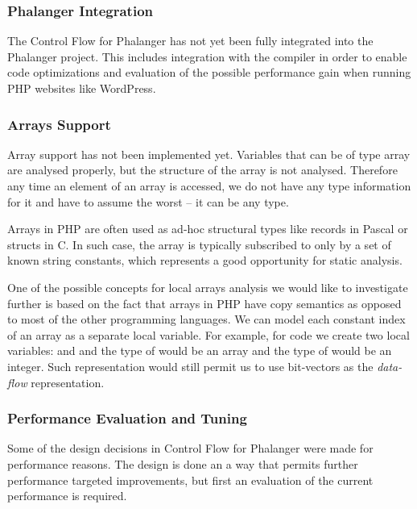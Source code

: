         \subsubsection*{Phalanger Integration}
        The Control Flow for Phalanger has not yet been fully 
        integrated into the Phalanger project. This includes 
        integration with the compiler in order to enable 
        code optimizations and evaluation of the possible 
        performance gain when running PHP websites like WordPress.
        
        \subsubsection*{Arrays Support}
        Array support has not been implemented yet. Variables 
        that can be of type array are analysed properly, but 
        the structure of the array is not analysed. Therefore 
        any time an element of an array is accessed, we do not 
        have any type information for it and have to assume 
        the worst -- it can be any type.
        
        Arrays in PHP are often used as ad-hoc structural 
        types like records in Pascal or structs in C. 
        In such case, the array is typically subscribed to 
        only by a set of known string constants, 
        which represents a good opportunity for 
        static analysis.
        
        One of the possible concepts for local arrays 
        analysis we would like to investigate further 
        is based on the fact that arrays in PHP have 
        copy semantics as opposed to most of the other 
        programming languages. We can model each constant 
        index of an array as a separate local variable. 
        For example, for code  we create 
        two local variables:  and  
        and the type of  would be an array and 
        the type of  would be an integer. 
        Such representation would still permit us to use 
        bit-vectors as the \emph{data-flow} representation.
        
        \subsubsection*{Performance Evaluation and Tuning}
        Some of the design decisions in Control Flow for 
        Phalanger were made for performance reasons. The 
        design is done an a way that permits further 
        performance targeted improvements, but first 
        an evaluation of the current performance is 
        required.
        
